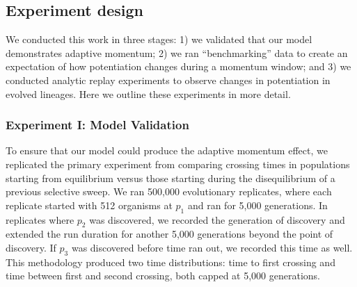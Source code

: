 \subsection{Experiment design}

We conducted this work in three stages: 
1) we validated that our model demonstrates adaptive momentum; 
2) we ran ``benchmarking'' data to create an expectation of how potentiation changes during a momentum window; 
and 3) we conducted analytic replay experiments to observe changes in potentiation in evolved lineages. 
Here we outline these experiments in more detail. 

\subsubsection{Experiment I: Model Validation}



To ensure that our model could produce the adaptive momentum effect, 
we replicated the primary experiment from \citep{Bohm2024.04.08.588357} comparing crossing times in populations starting from equilibrium versus those starting during the disequilibrium of a previous selective sweep. %
We ran 500,000 evolutionary replicates, where each replicate started with 512 organisms at $p_{1}$ and ran for 5,000 generations. 
In replicates where $p_{2}$ was discovered, we recorded the generation of discovery and extended the run duration for another 5,000 generations beyond the point of discovery. 
If $p_{3}$ was discovered before time ran out, we recorded this time as well. %
This methodology produced two time distributions: time to first crossing and time between first and second crossing, both capped at 5,000 generations.

